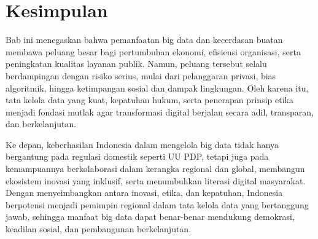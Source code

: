 \section{Kesimpulan}

Bab ini menegaskan bahwa pemanfaatan big data dan kecerdasan buatan membawa peluang besar bagi pertumbuhan ekonomi, efisiensi organisasi, serta peningkatan kualitas layanan publik. Namun, peluang tersebut selalu berdampingan dengan risiko serius, mulai dari pelanggaran privasi, bias algoritmik, hingga ketimpangan sosial dan dampak lingkungan. Oleh karena itu, tata kelola data yang kuat, kepatuhan hukum, serta penerapan prinsip etika menjadi fondasi mutlak agar transformasi digital berjalan secara adil, transparan, dan berkelanjutan.  

Ke depan, keberhasilan Indonesia dalam mengelola big data tidak hanya bergantung pada regulasi domestik seperti UU PDP, tetapi juga pada kemampuannya berkolaborasi dalam kerangka regional dan global, membangun ekosistem inovasi yang inklusif, serta menumbuhkan literasi digital masyarakat. Dengan menyeimbangkan antara inovasi, etika, dan kepatuhan, Indonesia berpotensi menjadi pemimpin regional dalam tata kelola data yang bertanggung jawab, sehingga manfaat big data dapat benar-benar mendukung demokrasi, keadilan sosial, dan pembangunan berkelanjutan.

